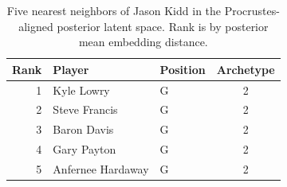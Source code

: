 \begin{table}[htbp]
  \centering\small
  \begin{tabular}{rllc}
    \toprule
    Rank & Player & Position & Archetype \\
    \midrule
    1 & Kyle Lowry & G & 2 \\
    2 & Steve Francis & G & 2 \\
    3 & Baron Davis & G & 2 \\
    4 & Gary Payton & G & 2 \\
    5 & Anfernee Hardaway & G & 2 \\
    \bottomrule
  \end{tabular}
  \caption{Five nearest neighbors of Jason Kidd in the Procrustes-aligned posterior latent space. Rank is by posterior mean embedding distance.}
  \label{tab:Jason_Kidd_neighbors}
\end{table}


